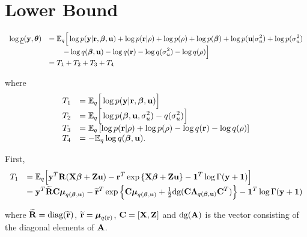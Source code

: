 \documentclass[a4paper,11pt]{article}
\begin{document}
\section{Lower Bound}

$$
\begin{array}{rl}
\ds \log \underline{p}(\vy,\vtheta)
    & \ds = 
\bE_q\Big[ 
\log p(\vy|\vr,\vbeta,\vu)
+ \log p(\vr|\rho)
+ \log p(\rho)
+ \log p(\vbeta)
+ \log p(\vu|\sigma_u^2)
+ \log p(\sigma_u^2) \\
    & \ds 
\qquad - \log q(\vbeta,\vu)
- \log q(\vr)
- \log q(\sigma_u^2)
- \log q(\rho)
\Big] \\
    & \ds = T_1 + T_2 + T_3 + T_4

\end{array}
$$

\noindent where
$$
\begin{array}{rl}
\displaystyle T_1  
    & \displaystyle = {\mathbb E}_q\Big[ 
    \log p({\bf y}|{\bf r},{\boldsymbol \beta},{\bf u}) \Big] 
\\
\displaystyle T_2  
    & \displaystyle = {\mathbb E}_q\Big[ 
    \log p({\boldsymbol \beta},{\bf u},\sigma_u^2) - q(\sigma_u^2) \Big]
\\
\displaystyle T_3 
    & \displaystyle = {\mathbb E}_q \left[ \log p({\bf r}|\rho) + \log p(\rho) - \log q({\bf r}) - \log q(\rho)
    \right]
\\
\displaystyle T_4
    & \displaystyle = - {\mathbb E}_q \log q({\boldsymbol \beta},{\bf u}).
\end{array}
$$

\noindent  First,
$$
\begin{array}{rl}
\displaystyle T_1 
    & \displaystyle = {\mathbb E}_q\Big[ 
{\bf y}^T{\bf R}({\bf X}{\boldsymbol \beta} + {\bf Z} {\bf u}) - {\bf r}^T\exp\left\{{\bf X}{\boldsymbol \beta} + {\bf Z}{\bf u} \right\}
-{\bf 1}^T\log \Gamma({\bf y} + {\bf 1}) \Big]
\\
    & \displaystyle =  {\bf y}^T\widetilde{{\bf R}}{\bf C}{\boldsymbol \mu}_{q({\boldsymbol \beta},{\bf u})}  - \widetilde{{\bf r}}^T\exp\left\{{\bf C}{\boldsymbol \mu}_{q({\boldsymbol \beta},{\bf u})}
    + \tfrac{1}{2}\mbox{dg}({\bf C}{\boldsymbol \Lambda}_{q({\boldsymbol \beta},{\bf u})}{\bf C}^T) \right\}
    -{\bf 1}^T\log \Gamma({\bf y} + {\bf 1}) 
\end{array}
$$

\noindent where $\widetilde{{\bf R}} = \mbox{diag}(\widetilde{{\bf r}})$,
$\widetilde{{\bf r}} = {\boldsymbol \mu}_{q({\bf r})}$,
${\bf C} = [{\bf X},{\bf Z}]$
and
$\mbox{dg}({\bf A})$ is the vector
consisting of the diagonal elements of ${\bf A}$.
\end{document}
